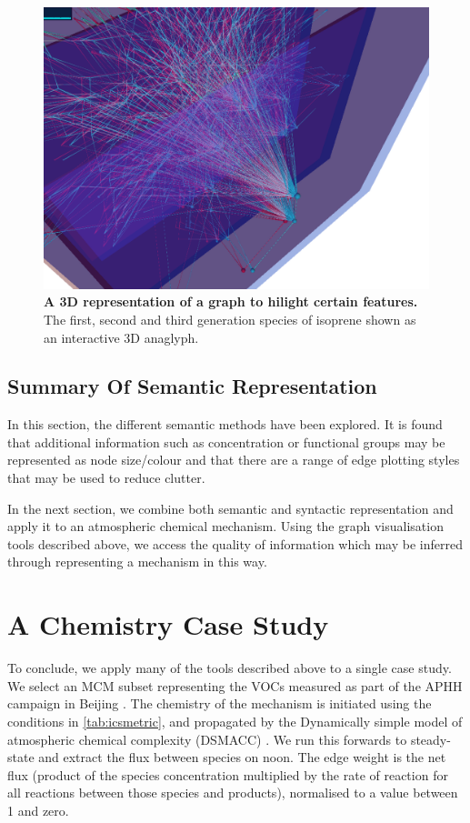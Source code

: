\begin{figure}[H]
     \centering
     \includegraphics[width=.6\textwidth]{figures_c1/layout/3D.png}
        \caption{\textbf{A 3D representation of a graph to hilight certain features.} The first, second and third generation species of isoprene shown as an interactive 3D anaglyph. }
      \label{fig:3D}
\end{figure}

\subsection{Summary Of Semantic Representation}
In this section, the different semantic methods have been explored. It is found that additional information such as concentration or functional groups may be represented as node size/colour and that there are a range of edge plotting styles that may be used to reduce clutter.

In the next section, we combine both semantic and syntactic representation and apply it to an atmospheric chemical mechanism. Using the graph visualisation tools described above, we access the quality of information which may be inferred through representing a mechanism in this way.


\section{A Chemistry Case Study}\label{sec:chemcase}
To conclude, we apply many of the tools described above to a single case study. We select an MCM subset representing the VOCs measured as part of the APHH campaign in Beijing \citep{aphh}. The chemistry of the mechanism is initiated using the conditions in \autoref{tab:icsmetric}, and propagated by the Dynamically simple model of atmospheric chemical complexity (DSMACC) \citep{dsmacc,dsmaccgit}. We run this forwards to steady-state and extract the flux between species on noon. The edge weight is the net flux (product of the species concentration multiplied by the rate of reaction for all reactions between those species and products), normalised to a value between 1 and zero.

